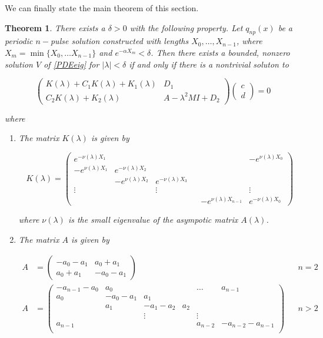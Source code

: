 \documentclass[12pt]{article}
\newtheorem{theorem}{Theorem}
\begin{document}

We can finally state the main theorem of this section.

\begin{theorem}\label{blockmatrixtheorem}
There exists a $\delta > 0$ with the following property. Let $q_{np}(x)$ be a periodic $n-$pulse solution constructed with lengths $X_0, \dots, X_{n-1}$, where $X_m = \min\{ X_0, \dots X_{n-1}\}$ and $e^{-\alpha X_m} < \delta$. Then there exists a bounded, nonzero solution $V$ of \eqref{PDEeig} for $|\lambda| < \delta$ if and only if there is a nontrivial soluton to

\begin{equation}\label{blockeq}
\begin{pmatrix}
K(\lambda) + C_1 K(\lambda) + K_1(\lambda) & D_1 \\
C_2 K(\lambda) + K_2(\lambda) & A - \lambda^2 MI + D_2
\end{pmatrix}
\begin{pmatrix}c \\ d \end{pmatrix} 
= 0
\end{equation}

where 

\begin{enumerate}

\item The matrix $K(\lambda)$ is given by

\begin{equation}
K(\lambda) = 
\begin{pmatrix}
e^{-\nu(\lambda)X_1} & & & & & -e^{\nu(\lambda)X_0} \\
-e^{\nu(\lambda)X_1} & e^{-\nu(\lambda)X_2} \\
& -e^{\nu(\lambda)X_2} & e^{-\nu(\lambda)X_3} \\
\vdots & & \vdots & &&  \vdots \\
& & & & -e^{\nu(\lambda)X_{n-1}} & e^{-\nu(\lambda)X_0} 
\end{pmatrix}
\end{equation}

where $\nu(\lambda)$ is the small eigenvalue of the asympotic matrix $A(\lambda)$.

\item The matrix $A$ is given by

\begin{align*}
A &= \begin{pmatrix}
-a_0 -a_1 & a_0 + a_1 \\
a_0 + a_1 & -a_0 - a_1
\end{pmatrix} && n = 2 \\
A &= \begin{pmatrix}
-a_{n-1} - a_0 & a_0 & & & \dots & a_{n-1}\\
a_0 & -a_0 - a_1 &  a_1 \\
& a_1 & -a_1 - a_2 &  a_2 \\
& & \vdots & & \vdots \\
a_{n-1} & & & & a_{n-2} & -a_{n-2} - a_{n-1} \\
\end{pmatrix} && n > 2
\end{align*}


\end{enumerate}
\end{theorem}
\end{document}
